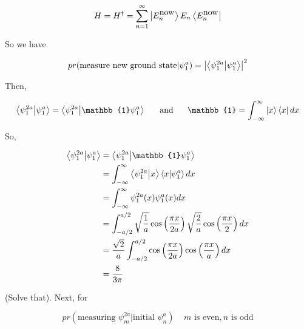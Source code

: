 \documentclass[english, 11pt]{article}
\begin{document}
        \begin{defn}\label{Born Rule}
        \[ H = H^\dagger = \sum_{n=1}^{\infty} \left|E_n^{\mbox{now}}\right\rangle E_n\left\langle E_n^{\mbox{now}}\right| \]
        \end{defn}

        So we have

        \[ pr(\mbox{measure new ground state}|\psi_1^a) = \pr{\braket{\psi_1^{2a}}{\psi_1^a}} \]

        Then,

        \[ \braket{\psi_1^{2a}}{\psi_1^a} = \braket{\psi_1^{2a}}{\mathbb{1}\psi_1^a} \ \ \ \ \ \mbox{and} \ \ \ \ \ \mathbb{1} = \int_{-\infty}^{\infty} \ket{x}\bra{x} dx \]

        So,

        \begin{align*}
          \braket{\psi_1^{2a}}{\psi_1^a} & = \braket{\psi_1^{2a}}{\mathbb{1}\psi_1^a} \\
          & = \int_{-\infty}^{\infty} \braket{\psi_1^{2a}}{x}\braket{x}{\psi_1^a} dx \\
          & = \int_{-\infty}^{\infty}\psi_1^{2a}(x)\psi_1^a(x) dx \\
          & = \int_{-a/2}^{a/2} \sqrt{\f{1}{a}} \cos \left( \f{\pi x}{2a} \right) \sqrt{\f{2}{a}} \cos \left( \f{\pi x}{2} \right) dx \\
          & = \f{\sqrt{2}}{a} \int_{-a/2}^{a/2} \cos \left( \f{\pi x}{2a} \right) \cos \left( \f{\pi x}{a} \right) dx \\
          & = \f{8}{3\pi}
        \end{align*}

        (Solve that). Next, for

        \[ pr \left( \mbox{measuring }\psi_m^{2a} | \mbox{initial }\psi_n^a \right) \ \ \ \ \ m \mbox{ is even}, n \mbox{ is odd} \]



  
\end{document}
